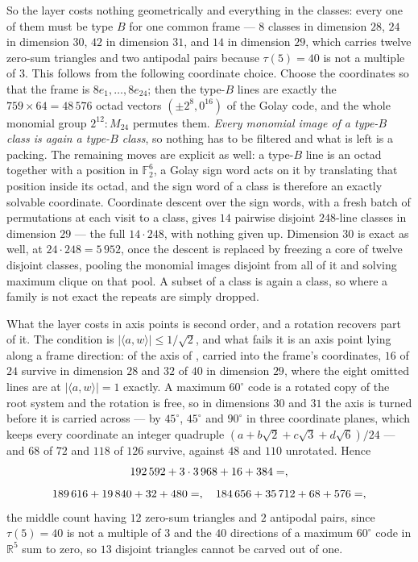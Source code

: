 \documentclass[11pt]{amsart}
\theoremstyle{remark}
\newcommand{\ip}[2]{\langle #1,#2\rangle}
\newcommand{\R}{\mathbb{R}}
\begin{document}
So the layer costs nothing geometrically and everything in the classes: every
one of them must be type $B$ for one common frame --- $8$ classes in dimension
$28$, $24$ in dimension $30$, $42$ in dimension $31$, and $14$ in dimension
$29$, which carries twelve zero-sum triangles and two antipodal pairs because
$\tau(5)=40$ is not a multiple of $3$. This follows from the following coordinate choice. Choose the coordinates so that the frame is $8e_{1},\dots,8e_{24}$;
then the type-$B$ lines are exactly the $759\times64=48\,576$ octad vectors
$(\pm2^{8},0^{16})$ of the Golay code, and the whole monomial group
$2^{12}{:}M_{24}$ permutes them. \emph{Every monomial image of a type-$B$ class
is again a type-$B$ class}, so nothing has to be filtered and what is left is a
packing. The remaining moves are explicit as well: a type-$B$ line is an octad
together with a position in $\mathbb{F}_{2}^{6}$, a Golay sign word acts on it by
translating that position inside its octad, and the sign word of a class is
therefore an exactly solvable coordinate. Coordinate descent over the sign
words, with a fresh batch of permutations at each visit to a class, gives $14$
pairwise disjoint $248$-line classes in dimension $29$ --- the full
$14\cdot248$, with nothing given up. Dimension $30$ is exact as well, at
$24\cdot248=5\,952$, once the descent is replaced by freezing a core of twelve
disjoint classes, pooling the monomial images disjoint from all of it and
solving maximum clique on that pool. A subset of a class is again a class, so
where a family is not exact the repeats are simply dropped.

What the layer costs in axis points is second order, and a rotation recovers
part of it. The condition is $|\ip{a}{w}|\le1/\sqrt2$, and what fails it is an
axis point lying along a frame direction: of the axis of \cite{ma-etal2025},
carried into the frame's coordinates, $16$ of $24$ survive in dimension $28$ and
$32$ of $40$ in dimension $29$, where the eight omitted lines are at
$|\ip{a}{w}|=1$ exactly. A maximum $60^{\circ}$ code is a rotated copy of the
root system and the rotation is free, so in dimensions $30$ and $31$ the axis is
turned before it is carried across --- by $45^{\circ}$, $45^{\circ}$ and
$90^{\circ}$ in three coordinate planes, which keeps every coordinate an integer
quadruple $(a+b\sqrt2+c\sqrt3+d\sqrt6)/24$ --- and $68$ of $72$ and $118$ of
$126$ survive, against $48$ and $110$ unrotated. Hence
\[
  192\,592+3\cdot3\,968+16+384=\Kh{28},
\]
\[
  189\,616+19\,840+32+480=\Kh{29},\quad
  184\,656+35\,712+68+576=\Kh{30} ,
\]
the middle count having $12$ zero-sum triangles and $2$ antipodal pairs, since
$\tau(5)=40$ is not a multiple of $3$ and the $40$ directions of a maximum
$60^{\circ}$ code in $\R^{5}$ sum to zero, so $13$ disjoint triangles cannot be
carved out of one.
\end{document}
